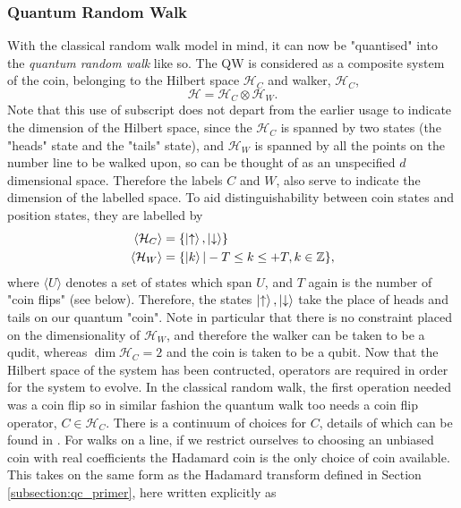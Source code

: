 \subsubsection{Quantum Random Walk}
With the classical random walk model in mind, it can now be "quantised" into the \emph{quantum random walk} like so.
The QW is considered as a composite system of the coin, belonging to the Hilbert space $\mathcal{H}_C$ and walker, $\mathcal{H}_C$,
\begin{equation}
    \mathcal{H} = \mathcal{H}_C \otimes \mathcal{H}_W.
\end{equation}
Note that this use of subscript does not depart from the earlier usage to indicate the dimension of the Hilbert space, since the $\mathcal{H}_C$ is spanned by two states (the "heads" state and the "tails" state), and $\mathcal{H}_W$ is spanned by all the points on the number line to be walked upon, so can be thought of as an unspecified $d$ dimensional space.
Therefore the labels $C$ and $W$, also serve to indicate the dimension of the labelled space.\newline
To aid distinguishability between coin states and position states, they are labelled by
\begin{align}
    \langle\mathcal{H}_C\rangle &= \{\ket{\uparrow}, \ket{\downarrow}\}\\
    \langle\mathcal{H}_W\rangle &= \{\ket{k} | -T\leq k \leq +T, k\in\mathbb{Z}\},
\end{align}
where $\langle U \rangle$ denotes a set of states which span $U$, and $T$ again is the number of "coin flips" (see below). 
Therefore, the states $\ket{\uparrow}, \ket{\downarrow}$ take the place of heads and tails on our quantum "coin". 
Note in particular that there is no constraint placed on the dimensionality of $\mathcal{H}_W$, and therefore the walker can be taken to be a qudit, whereas $\dim{\mathcal{H}_C} = 2$ and the coin is taken to be a qubit.
Now that the Hilbert space of the system has been contructed, operators are required in order for the system to evolve.
In the classical random walk, the first operation needed was a coin flip so in similar fashion the quantum walk too needs a coin flip operator, $C\in \mathcal{H}_C$. 
There is a continuum of choices for $C$, details of which can be found in \cite{Tregenna2003}. 
For walks on a line, if we restrict ourselves to choosing an unbiased coin with real coefficients the Hadamard coin is the only choice of coin available.
This takes on the same form as the Hadamard transform defined in Section \ref{subsection:qc_primer}, here written explicitly as
